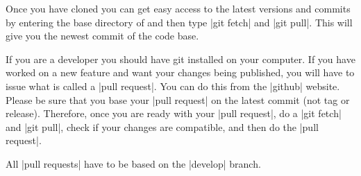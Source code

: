 Once you have cloned \shyfem{} you can get easy access to the latest
versions and commits by entering the base directory of \shyfem{} and
then type |git fetch| and |git pull|. This will give you the newest
commit of the code base.

If you are a developer you should have git installed on your computer.
If you have worked on a new feature and want your changes being published,
you will have to issue what is called a |pull request|. You can do
this from the |github| website. Please be sure that you base your 
|pull request| on the latest commit (not tag or release). Therefore, once you
are ready with your |pull request|, do a |git fetch| and |git pull|,
check if your changes are compatible, and then do the |pull request|.

All |pull requests| have to be based on the |develop| branch.

